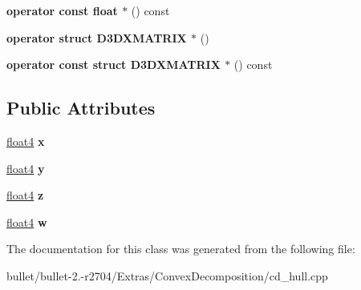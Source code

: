 \begin{DoxyCompactItemize}
\item 
\hypertarget{class_convex_decomposition_1_1float4x4_a5ab5f4bd370f289b746c3627bf352163}{{\bfseries operator const float $\ast$} () const }\label{class_convex_decomposition_1_1float4x4_a5ab5f4bd370f289b746c3627bf352163}

\item 
\hypertarget{class_convex_decomposition_1_1float4x4_ac08947a712be685758517292e56facdd}{{\bfseries operator struct D3\+D\+X\+M\+A\+T\+R\+I\+X $\ast$} ()}\label{class_convex_decomposition_1_1float4x4_ac08947a712be685758517292e56facdd}

\item 
\hypertarget{class_convex_decomposition_1_1float4x4_a463344f175a2f2963c7f6d28a84c05e9}{{\bfseries operator const struct D3\+D\+X\+M\+A\+T\+R\+I\+X $\ast$} () const }\label{class_convex_decomposition_1_1float4x4_a463344f175a2f2963c7f6d28a84c05e9}

\end{DoxyCompactItemize}
\subsection*{Public Attributes}
\begin{DoxyCompactItemize}
\item 
\hypertarget{class_convex_decomposition_1_1float4x4_a65bc6c3d5a414903ecbed1734da0cf3a}{\hyperlink{class_convex_decomposition_1_1float4}{float4} {\bfseries x}}\label{class_convex_decomposition_1_1float4x4_a65bc6c3d5a414903ecbed1734da0cf3a}

\item 
\hypertarget{class_convex_decomposition_1_1float4x4_a05ea15e8a1c01382a2510d65c924154d}{\hyperlink{class_convex_decomposition_1_1float4}{float4} {\bfseries y}}\label{class_convex_decomposition_1_1float4x4_a05ea15e8a1c01382a2510d65c924154d}

\item 
\hypertarget{class_convex_decomposition_1_1float4x4_a6f46e22d19bfce74dd6481c4146e07b6}{\hyperlink{class_convex_decomposition_1_1float4}{float4} {\bfseries z}}\label{class_convex_decomposition_1_1float4x4_a6f46e22d19bfce74dd6481c4146e07b6}

\item 
\hypertarget{class_convex_decomposition_1_1float4x4_a222506da1ab0aeef4cbec2fe96ce509f}{\hyperlink{class_convex_decomposition_1_1float4}{float4} {\bfseries w}}\label{class_convex_decomposition_1_1float4x4_a222506da1ab0aeef4cbec2fe96ce509f}

\end{DoxyCompactItemize}


The documentation for this class was generated from the following file\+:\begin{DoxyCompactItemize}
\item 
bullet/bullet-\/2.-\/r2704/\+Extras/\+Convex\+Decomposition/cd\+\_\+hull.\+cpp\end{DoxyCompactItemize}
